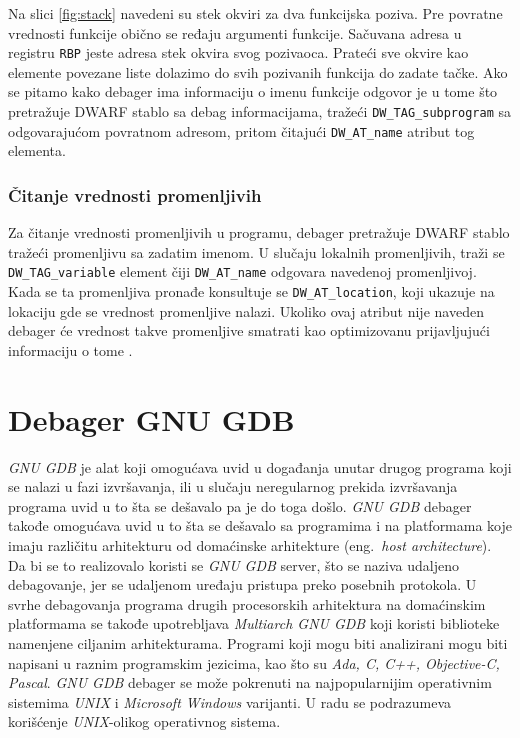 \documentclass[12pt,oneside]{memoir}
\begin{document}
Na slici \ref{fig:stack} navedeni su stek okviri za dva funkcijska poziva. Pre povratne vrednosti funkcije obično se ređaju argumenti funkcije. Sačuvana adresa u registru \texttt{RBP} jeste adresa stek okvira svog pozivaoca. Prateći sve okvire kao elemente povezane liste dolazimo do svih pozivanih funkcija do zadate tačke. Ako se pitamo kako debager ima informaciju o imenu funkcije odgovor je u tome što pretražuje DWARF stablo sa debag informacijama, tražeći \texttt{DW\_TAG\_subprogram} sa odgovarajućom povratnom adresom, pritom čitajući \texttt{DW\_AT\_name} atribut tog elementa.

\subsection{Čitanje vrednosti promenljivih}

Za čitanje vrednosti promenljivih u programu, debager pretražuje DWARF stablo tražeći promenljivu sa zadatim imenom. U slučaju lokalnih promenljivih, traži se \texttt{DW\_TAG\_variable} element čiji \texttt{DW\_AT\_name} odgovara navedenoj promenljivoj. Kada se ta promenljiva pronađe konsultuje se \texttt{DW\_AT\_location}, koji ukazuje na lokaciju gde se vrednost promenljive nalazi. Ukoliko ovaj atribut nije naveden debager će vrednost takve promenljive smatrati kao optimizovanu prijavljujući informaciju o tome \cite{GDB}.

\chapter{Debager GNU GDB}
\label{chp:GDB}

\emph{GNU GDB} je alat koji omogućava uvid u događanja unutar drugog programa koji se nalazi u fazi izvršavanja, ili u slučaju neregularnog prekida izvršavanja programa uvid u to šta se dešavalo pa je do toga došlo. \emph{GNU GDB} debager takođe omogućava uvid u to šta se dešavalo sa programima i na platformama koje imaju različitu arhitekturu od domaćinske arhitekture (eng.~\emph{host architecture}). Da bi se to realizovalo koristi se \emph{GNU GDB} server, što se naziva udaljeno debagovanje, jer se udaljenom uređaju pristupa preko posebnih protokola. U svrhe debagovanja programa drugih procesorskih arhitektura na domaćinskim platformama se takođe upotrebljava \emph{Multiarch GNU GDB} koji koristi biblioteke namenjene ciljanim arhitekturama. Programi koji mogu biti analizirani mogu biti napisani u raznim programskim jezicima, kao što su \emph{Ada, C, C++, Objective-C, Pascal}. \emph{GNU GDB} debager se može pokrenuti na najpopularnijim operativnim sistemima \emph{UNIX} i \emph{Microsoft Windows} varijanti. U radu se podrazumeva korišćenje \emph{UNIX}-olikog operativnog sistema.
\end{document}
